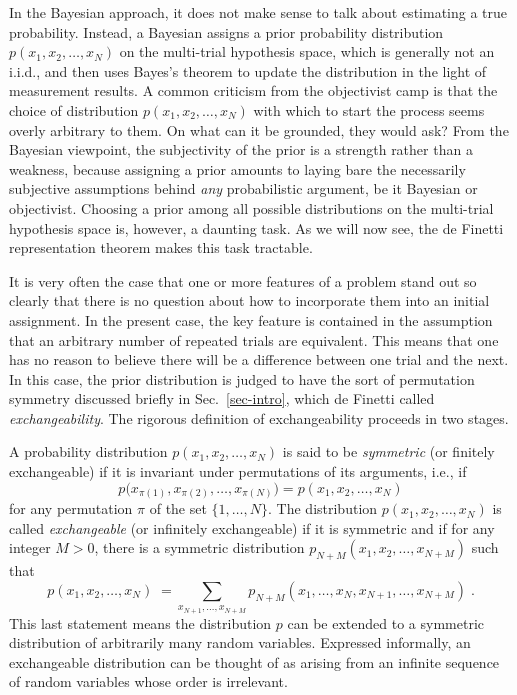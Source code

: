 \documentclass[12pt,aps,eqsecnum]{revtex4-1}
\begin{document}
In the Bayesian approach, it does not make sense to talk about
estimating a true probability.  Instead, a Bayesian assigns a
prior probability distribution $p(x_1,x_2,\ldots,x_N)$ on the
multi-trial hypothesis space, which is generally not an i.i.d.,
and then uses Bayes's theorem to update the distribution in the
light of measurement results. A common criticism from the
objectivist camp is that the choice of distribution
$p(x_1,x_2,\ldots,x_N)$ with which to start the process seems
overly arbitrary to them. On what can it be grounded, they would
ask? From the Bayesian viewpoint, the subjectivity of the prior is
a strength rather than a weakness, because assigning a prior
amounts to laying bare the necessarily subjective assumptions
behind {\it any\/} probabilistic argument, be it Bayesian or
objectivist. Choosing a prior among all possible distributions on
the multi-trial hypothesis space is, however, a daunting task. As
we will now see, the de Finetti representation theorem makes this
task tractable.

It is very often the case that one or more features of a problem
stand out so clearly that there is no question about how to
incorporate them into an initial assignment. In the present case,
the key feature is contained in the assumption that an arbitrary
number of repeated trials are equivalent.  This means that one has
no reason to believe there will be a difference between one trial
and the next. In this case, the prior distribution is judged to
have the sort of permutation symmetry discussed briefly in
Sec.~\ref{sec-intro}, which de Finetti \cite{DeFinettiCollected}
called {\it exchangeability}.  The rigorous definition of
exchangeability proceeds in two stages.

A probability distribution $p(x_1,x_2,\ldots,x_N)$ is said to be
{\it symmetric\/} (or finitely exchangeable) if it is invariant
under permutations of its arguments, i.e., if
\begin{equation}
p\bigl(x_{\pi(1)},x_{\pi(2)},\ldots,x_{\pi(N)}\bigr) =
p(x_1,x_2,\ldots,x_N)
\end{equation}
for any permutation $\pi$ of the set $\{1,\ldots,N\}$. The
distribution $p(x_1,x_2,\ldots,x_N)$ is called {\it
exchangeable\/} (or infinitely exchangeable) if it is symmetric
and if for any integer $M>0$, there is a symmetric distribution
$p_{N+M}(x_1,x_2,\ldots,x_{N+M})$ such that
\begin{equation}
p(x_1,x_2,\ldots,x_N)\; =
\sum_{x_{N+1},\ldots,x_{N+M}}
p_{N+M}(x_1,\ldots,x_N,x_{N+1},\ldots,x_{N+M})
\;.
\label{eq-marginal}
\end{equation}
This last statement means the distribution $p$ can be extended to
a symmetric distribution of arbitrarily many random variables.
Expressed informally, an exchangeable distribution can be thought
of as arising from an infinite sequence of random variables whose
order is irrelevant.
\end{document}
